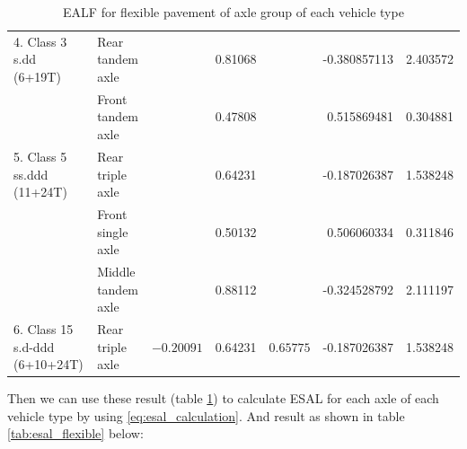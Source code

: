 \begin{table}[H]
{\begin{tabular}{|llclcr
>{\columncolor[HTML]{C0E6F5}}c |}
\multicolumn{1}{|l|}{\multirow{-2}{*}{4. Class 3 s.dd (6+19T)}}          & \multicolumn{1}{l|}{Rear tandem axle}   & \multicolumn{1}{c|}{}                            & \multicolumn{1}{l|}{0.81068} & \multicolumn{1}{c|}{}                           & \multicolumn{1}{r|}{-0.380857113} & 2.403572 \\ \cline{1-2} \cline{4-4} \cline{6-7}
\multicolumn{1}{|l|}{}                                                   & \multicolumn{1}{l|}{Front tandem axle}  & \multicolumn{1}{c|}{}                            & \multicolumn{1}{l|}{0.47808} & \multicolumn{1}{c|}{}                           & \multicolumn{1}{r|}{0.515869481}  & 0.304881 \\ \cline{2-2} \cline{4-4} \cline{6-7}
\multicolumn{1}{|l|}{\multirow{-2}{*}{5. Class 5 ss.ddd (11+24T)}}       & \multicolumn{1}{l|}{Rear triple axle}   & \multicolumn{1}{c|}{}                            & \multicolumn{1}{l|}{0.64231} & \multicolumn{1}{c|}{}                           & \multicolumn{1}{r|}{-0.187026387} & 1.538248 \\ \cline{1-2} \cline{4-4} \cline{6-7}
\multicolumn{1}{|l|}{}                                                   & \multicolumn{1}{l|}{Front single axle}  & \multicolumn{1}{c|}{}                            & \multicolumn{1}{l|}{0.50132} & \multicolumn{1}{c|}{}                           & \multicolumn{1}{r|}{0.506060334}  & 0.311846 \\ \cline{2-2} \cline{4-4} \cline{6-7}
\multicolumn{1}{|l|}{}                                                   & \multicolumn{1}{l|}{Middle tandem axle} & \multicolumn{1}{c|}{}                            & \multicolumn{1}{l|}{0.88112} & \multicolumn{1}{c|}{}                           & \multicolumn{1}{r|}{-0.324528792} & 2.111197 \\ \cline{2-2} \cline{4-4} \cline{6-7}
\multicolumn{1}{|l|}{\multirow{-3}{*}{6. Class 15 s.d-ddd (6+10+24T)}}   & \multicolumn{1}{l|}{Rear triple axle}   & \multicolumn{1}{c|}{\multirow{-13}{*}{$-0.20091$}} & \multicolumn{1}{l|}{0.64231} & \multicolumn{1}{c|}{\multirow{-13}{*}{$0.65775$}} & \multicolumn{1}{r|}{-0.187026387} & 1.538248 \\ \hline
\end{tabular}}
\caption{EALF for flexible pavement of axle group of each vehicle type}
\label{tab:ealf_flexible}
\end{table}
Then we can use these result (table \ref{tab:ealf_flexible}) to calculate ESAL for each axle of
each vehicle type by using \ref{eq:esal_calculation}. And result as shown in table
\ref{tab:esal_flexible} below:
